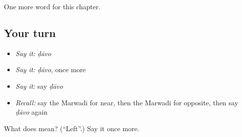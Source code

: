 \begin{grammarlens}[title={What you've built}]
One more word for this chapter.
\end{grammarlens}

\subsection*{Your turn}
\begin{itemize}
\raggedright
  \item \emph{Say it:} \emph{ḍāvo}
  \item \emph{Say it:} \emph{ḍāvo}, once more
  \item \emph{Say it:} say \emph{ḍāvo}
  \item \emph{Recall:} say the Marwadi for near, then the Marwadi for opposite, then say \emph{ḍāvo} again
\end{itemize}

\begin{tcolorbox}[breakable,colback=teal!4,colframe=teal!35!black,title={Before you move on}]
What does  mean? (\textquotedblleft{}Left\textquotedblright{}.) Say it once more.
\end{tcolorbox}

